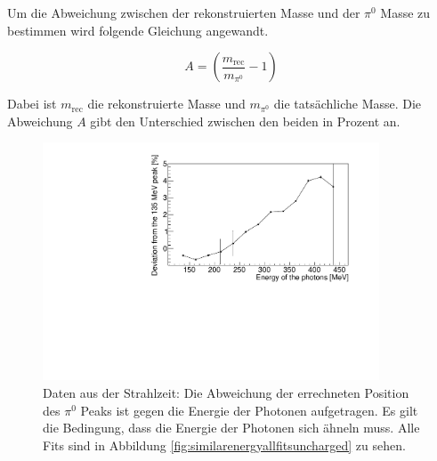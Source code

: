 \documentclass[a4paper,11pt,oneside,final,german,openbib,pdftex]{scrbook}
\begin{document}
{ %
 
 
 Um die Abweichung zwischen der rekonstruierten Masse und der $\pi^0$ Masse zu bestimmen wird folgende Gleichung angewandt.
 
 \begin{equation}
 A = (\frac{m_{\text{rec}}}{m_{\pi^0}}-1)
 \end{equation}
 
 Dabei ist $m_{\text{rec}}$ die rekonstruierte Masse und $m_{\pi^0}$ die tats\"achliche Masse. Die Abweichung $A$ gibt den Unterschied zwischen den beiden in Prozent an.
 
 
 \begin{figure}[h!]
 	\begin{center}
 		\includegraphics[width=100mm]{20170405StrahlzeitDeviatoinNoCut}
 	
 		\caption[Strahlzeit: Abweichung; keine weiteren Bedingungen]{Daten aus der Strahlzeit: Die Abweichung der errechneten Position des $\pi^0$ Peaks ist gegen die Energie der Photonen aufgetragen.
 			Es gilt die Bedingung, dass die Energie der Photonen sich \"ahneln muss. Alle Fits sind in Abbildung \ref{fig:similarenergyallfitsuncharged} zu sehen.} 
 		\label{fig.Energydependency_pion}
 	\end{center}
 \end{figure}

}
\end{document}
